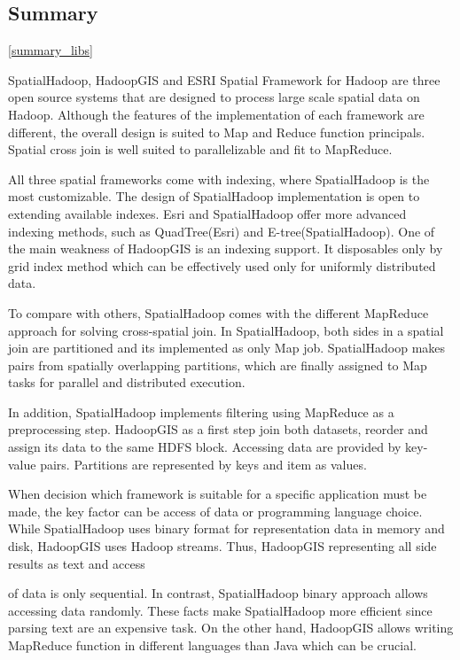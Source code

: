 \documentclass[a4paper,12pt,oneside]{report}
\begin{document}
		\subsection{Summary}\ref{summary_libs}
		
 SpatialHadoop, HadoopGIS and ESRI Spatial Framework for Hadoop are
three open source systems that are designed to process large scale
spatial data on Hadoop. Although the features of  the implementation of each framework are different, 
the overall design is suited to Map and Reduce function principals. Spatial cross join is well suited to parallelizable and fit to MapReduce. 

All three spatial frameworks come with indexing, where SpatialHadoop is the most customizable. 
The design of  SpatialHadoop implementation is open to extending available indexes. Esri and 
SpatialHadoop offer more advanced indexing methods, such as 
QuadTree(Esri) and E-tree(SpatialHadoop). One of the main weakness of HadoopGIS is an indexing 
support. It disposables only by grid index method which can be 
effectively used only for uniformly distributed data.

To compare with others, SpatialHadoop comes with the different MapReduce approach for solving cross-spatial join.
In SpatialHadoop, both sides in a spatial join are partitioned and its implemented as only 
Map job.  SpatialHadoop makes pairs from spatially overlapping partitions, which are finally 
assigned to Map tasks for parallel and distributed execution.

In addition, SpatialHadoop implements filtering using MapReduce as a preprocessing step.
HadoopGIS as a first step join both datasets, reorder and assign its data to the same 
HDFS block.  Accessing data are provided by key-value pairs. Partitions are represented by keys and item as values. 

When decision which framework is suitable for a specific application must be made, the 
key factor can be access of data  or programming language choice. While SpatialHadoop 
uses binary format for representation data in memory and disk, HadoopGIS 
uses Hadoop streams. Thus, HadoopGIS representing all side results as text and access 

of data is only sequential. In contrast, SpatialHadoop binary approach allows 
accessing data randomly.
These facts make SpatialHadoop more efficient since parsing text are an expensive task. 
On the other hand, HadoopGIS allows writing MapReduce function in different languages than Java which can be crucial. 
\end{document}
